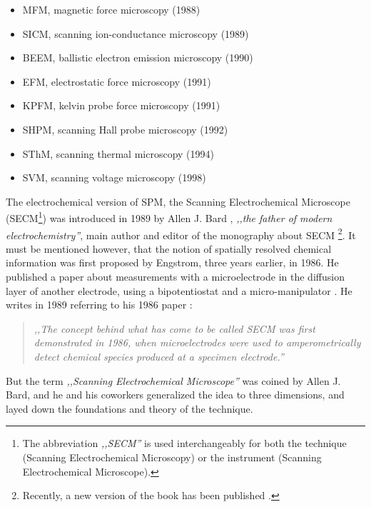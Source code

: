\begin{itemize}
\item MFM, magnetic force microscopy (1988) \cite{hartmann1988magnetic}
\item SICM, scanning ion-conductance microscopy (1989) \cite{hansma1989scanning}
\item BEEM, ballistic electron emission microscopy (1990) \cite{kaiser1990direct}
\item EFM, electrostatic force microscopy (1991) \cite{weaver1991high}
\item KPFM, kelvin probe force microscopy (1991) \cite{nonnenmacher1991kelvin}
\item SHPM, scanning Hall probe microscopy (1992) \cite{chang1992scanning}
\item SThM, scanning thermal microscopy (1994) \cite{xu1994thermal}
\item SVM, scanning voltage microscopy (1998) \cite{trenkler1998nanopotentiometry}
\end{itemize}

The electrochemical version of SPM, the Scanning Electrochemical Microscope (SECM\footnote{The abbreviation \emph{,,SECM''} is used interchangeably for both the technique (Scanning Electrochemical Microscopy) or the instrument (Scanning Electrochemical Microscope).}) was introduced in 1989 by Allen J. Bard \cite{bard1989scanning}, \emph{,,the father of modern electrochemistry''}, main author and editor of the monography about SECM \cite{bard1994scanning}\footnote{Recently, a new version of the book has been published \cite{bard2012scanning}.}.
It must be mentioned however, that the notion of spatially resolved chemical information was first proposed by Engstrom, three years earlier, in 1986.
He published a paper about measurements with a microelectrode in the diffusion layer of another electrode, using a bipotentiostat and a micro-manipulator \cite{engstrom1986measurements}.
He writes in 1989 \cite{engstrom1989scanning} referring to his 1986 paper \cite{engstrom1986measurements}:

\begin{quote}
\vspace{0.5cm}
\emph{,,The concept behind what has come to be called SECM was first demonstrated in 1986, when microelectrodes were used to amperometrically detect chemical species produced at a specimen electrode.''}
\vspace{0.5cm}
\end{quote}

But the term \emph{,,Scanning Electrochemical Microscope''} was coined by Allen J. Bard, and he and his coworkers generalized the idea to three dimensions, and layed down the foundations and theory of the technique. 

